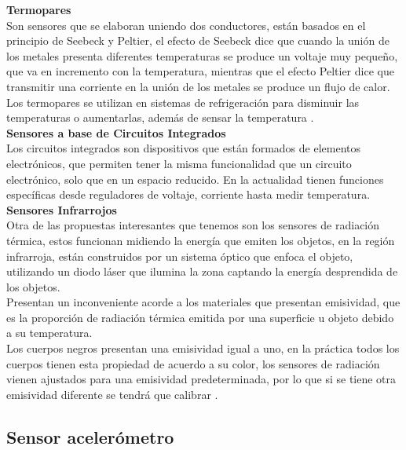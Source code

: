 \textbf{Termopares} \\

Son sensores que se elaboran uniendo dos conductores, están basados en el principio de Seebeck y Peltier, el efecto de Seebeck dice que cuando la unión de los metales presenta diferentes temperaturas se produce un voltaje muy pequeño, que va en incremento con la temperatura, mientras que el efecto Peltier dice que transmitir una corriente en la unión de los metales se produce un flujo de calor. Los termopares se utilizan en sistemas de refrigeración para disminuir las temperaturas o aumentarlas, además de sensar la temperatura \cite{dieciocho}. \\

\textbf{Sensores a base de Circuitos Integrados} \\

Los circuitos integrados son dispositivos que están formados de elementos electrónicos, que permiten tener la misma funcionalidad que un circuito electrónico, solo que en un espacio reducido. En la actualidad tienen funciones específicas desde reguladores de voltaje, corriente hasta medir temperatura. \\

\textbf{Sensores Infrarrojos} \\

Otra de las propuestas interesantes que tenemos son los sensores de radiación térmica, estos funcionan midiendo la energía que emiten los objetos, en la región infrarroja, están construidos por un sistema óptico que enfoca el objeto, utilizando un diodo láser que ilumina la zona captando la energía desprendida de los objetos. \\

Presentan un inconveniente acorde a los materiales que presentan emisividad, que es la proporción de radiación térmica emitida por una superficie u objeto debido a su temperatura. \\

Los cuerpos negros presentan una emisividad igual a uno, en la práctica todos los cuerpos tienen esta propiedad de acuerdo a su color, los sensores de radiación vienen ajustados para una emisividad predeterminada, por lo que si se tiene otra emisividad diferente se tendrá que calibrar \cite{diecinueve}. 

\subsection{Sensor acelerómetro}
\renewcommand{\theequation}{\arabic{equation}}

